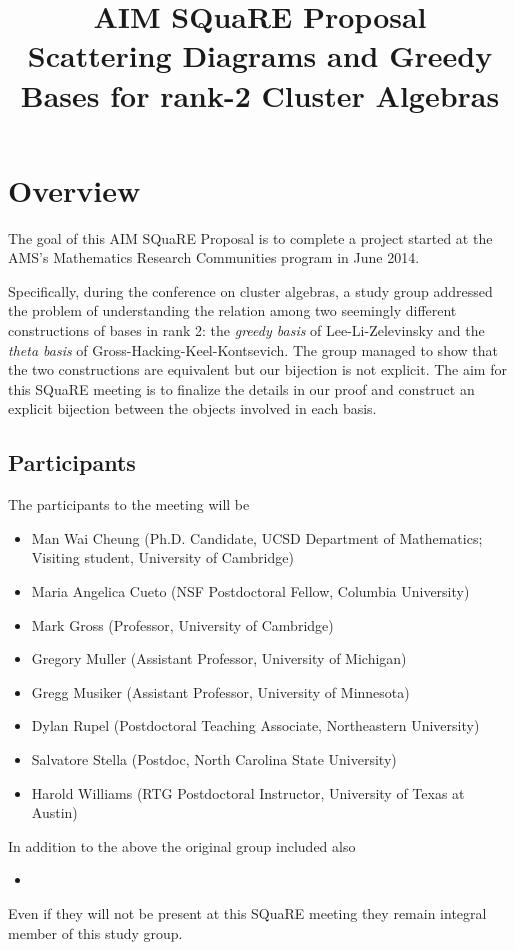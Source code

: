 \documentclass{amsart}
\title[\small{Scattering Diagrams and Greedy Bases for rank-2 Cluster Algebras}]
  {AIM SQuaRE Proposal\\ 
  \small{Scattering Diagrams and Greedy Bases for rank-2 Cluster Algebras}}
\begin{document}
  \maketitle
  
  \section*{Overview}
    The goal of this AIM SQuaRE Proposal is to complete a project started at the
    AMS's Mathematics Research Communities program in June 2014. 
    
    Specifically, during the conference on cluster algebras, a study group
    addressed the problem of understanding the relation among two seemingly
    different constructions of bases in rank 2: the \emph{greedy basis} of
    Lee-Li-Zelevinsky and the \emph{theta basis} of
    Gross-Hacking-Keel-Kontsevich. The group managed to show that the two
    constructions are equivalent but our bijection is not explicit. The aim for
    this SQuaRE meeting is to finalize the details in our proof and construct an
    explicit bijection between the objects involved in each basis.
  
  \subsection*{Participants}
    The participants to the meeting will be 
    \begin{itemize}
      \item Man Wai Cheung (Ph.D. Candidate, UCSD Department of Mathematics;
          Visiting student, University of Cambridge)
      \item Maria Angelica Cueto (NSF Postdoctoral Fellow, Columbia University)
      \item Mark Gross (Professor, University of Cambridge)
      \item Gregory Muller (Assistant Professor, University of Michigan)
      \item Gregg Musiker (Assistant Professor, University of Minnesota)
      \item Dylan Rupel (Postdoctoral Teaching Associate, Northeastern
          University)
      \item Salvatore Stella (Postdoc, North Carolina State University)
      \item Harold Williams (RTG Postdoctoral Instructor, University of 
          Texas at Austin) 
    \end{itemize}
    In addition to the above the original group included also
    \begin{itemize}
      \item
    \end{itemize}
    Even if they will not be present at this SQuaRE meeting they remain integral
    member of this study group. 
  
\end{document}
